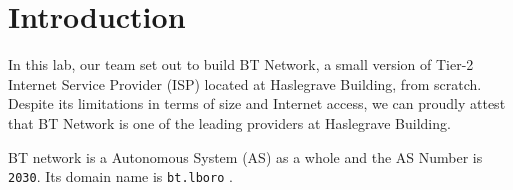 \chapter{Introduction}
\label{chap:introduction}

In this lab, our team set out to build BT Network, a small version of Tier-2 Internet Service Provider (ISP) located at Haslegrave Building, from scratch. Despite its limitations in terms of size and Internet access, we can proudly attest that BT Network is one of the leading providers at Haslegrave Building.

BT network is a Autonomous System (AS) as a whole and the AS Number is \texttt{2030}. Its domain name is \texttt{bt.lboro} .

